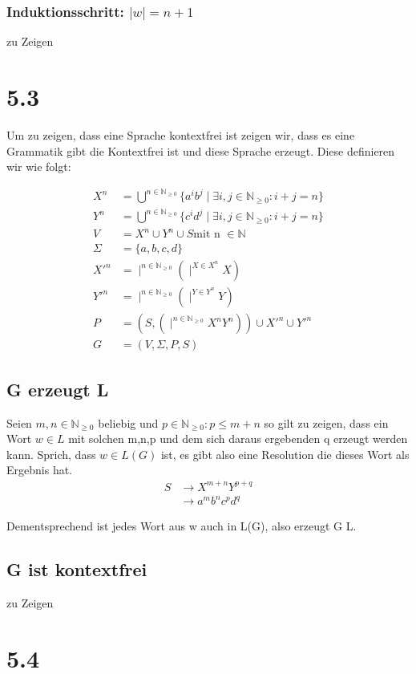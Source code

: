 \documentclass[12pt, a4paper]{article}
\begin{document}
\subsubsection*{Induktionsschritt: $\mid w \mid = n + 1$}
zu Zeigen

\section*{5.3}
Um zu zeigen, dass eine Sprache kontextfrei ist zeigen wir, dass es eine Grammatik gibt die Kontextfrei ist und diese Sprache erzeugt.
Diese definieren wir wie folgt:

\begin{align*}
X^n &= \bigcup^{n \in \mathbb{N}_{\ge 0}} \{a^i b^j \mid \exists i,j \in \mathbb{N}_{\ge 0}: i + j = n \} \\
Y^n &= \bigcup^{n \in \mathbb{N}_{\ge 0}} \{c^i d^j \mid \exists i,j \in \mathbb{N}_{\ge 0}: i + j = n \} \\
V &= X^n \cup Y^n \cup S \text{mit n } \in \mathbb{N} \\
\Sigma &= \{ a,b,c,d \} \\
X'^n &= \mid^{n \in \mathbb{N}_{\ge 0}} (\mid^{X \in X^n} X) \\
Y'^n &= \mid^{n \in \mathbb{N}_{\ge 0}} (\mid^{Y \in Y^n} Y) \\
P &= (S , (\mid^{n \in \mathbb{N}_{\ge 0}} X^n Y^n)) \cup X'^n \cup Y'^n \\
G &= (V, \Sigma, P, S)
\end{align*}

\subsection*{G erzeugt L}
Seien $m,n \in \mathbb{N}_{\ge 0}$ beliebig und $p \in \mathbb{N}_{\ge 0}: p \le m+n$ so gilt zu zeigen, dass ein Wort $w \in L$ mit solchen m,n,p und dem sich daraus ergebenden q erzeugt werden kann. Sprich, dass $w \in L(G)$ ist, es gibt also eine Resolution die dieses Wort als Ergebnis hat.
\begin{align*}
S &\rightarrow X^{m+n} Y^{p+q} \\
&\rightarrow a^m b^n c^p d^q
\end{align*}

Dementsprechend ist jedes Wort aus w auch in L(G), also erzeugt G L.
\subsection*{G ist kontextfrei}
zu Zeigen

\section*{5.4}
\end{document}
